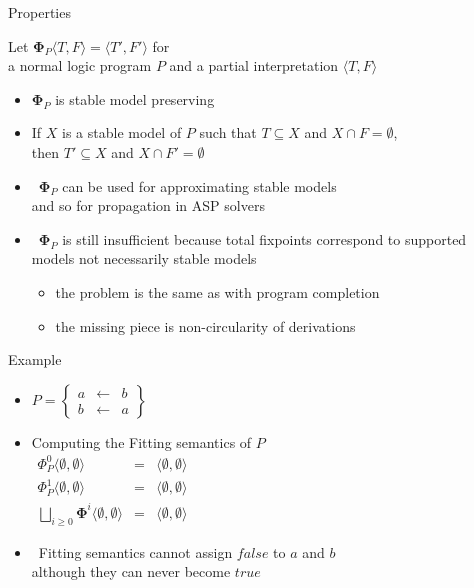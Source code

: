\begin{frame}{Properties}

  Let ${\mathbf{\Phi}}_P\langle T,F \rangle=\langle T',F'\rangle$
  for\\
  a normal logic program $P$ and
  a partial interpretation $\langle T,F \rangle$
  \smallskip
  \begin{itemize}
  \item<2-> ${\mathbf{\Phi}}_P$ is \alert{stable model preserving}
  \item<2-> [] If $X$ is a stable model of $P$ such that $T\subseteq X$ and $X\cap F=\emptyset$,
    \\ then $T'\subseteq X$ and $X\cap F'=\emptyset$
    \smallskip
  \item<3->  \ ${\mathbf{\Phi}}_P$ can be used for approximating stable models
    \\ and so for propagation in ASP solvers
    \medskip
  \item <4->   \ ${\mathbf{\Phi}}_P$ is still insufficient because total fixpoints
    correspond to supported models not necessarily stable models
    \begin{itemize}\normalsize
    \item the problem is the same as with program completion
    \item the missing piece is non-circularity of derivations
    \end{itemize}
  \end{itemize}
\end{frame}
\begin{frame}{Example}
  \bigskip
  \begin{itemize}
  \item<1->
    \(
    P
    =
    \left\{
      \begin{array}{lcl}
        a &\leftarrow & b \\
        b &\leftarrow & a
      \end{array}
    \right\}
    \)
    \bigskip
  \item<2-> Computing the Fitting semantics of $P$
    \\
    \medskip
    \(
    \begin{array}{lcl}
      \Phi_P^0\langle \emptyset,\emptyset\rangle &=&\langle \emptyset,\emptyset\rangle\\
      \Phi_P^1\langle \emptyset,\emptyset\rangle &=&\langle \emptyset,\emptyset\rangle
      \\[5pt]
      \bigsqcup_{i \geq 0}\mathbf{\Phi}^i\langle\emptyset,\emptyset\rangle&=&\langle\emptyset,\emptyset\rangle
    \end{array}
    \)
    \bigskip
  \item<3->  \
    Fitting semantics cannot assign $\mathit{false}$ to $a$ and $b$
    \\
    although they can never become $\mathit{true}$
  \end{itemize}
\end{frame}
%
